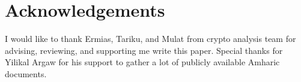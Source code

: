 \section{Acknowledgements}

I would like to thank Ermias, Tariku, and Mulat from crypto analysis team for advising, reviewing, and supporting me write this paper. Special thanks for Yilikal Argaw for his support to gather a lot of publicly available Amharic documents.
